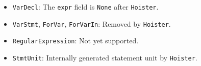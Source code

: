 \documentclass[a4paper, leqno]{amsart}
\newcommand{\stmt}{s}
\newcommand{\expr}{e}
\def\inred{\color{red}}
\def\inblue{\color{blue}}
\begin{document}
{\inred
\begin{itemize}
\item {\tt VarDecl}: The {\tt expr} field is {\tt None} after {\tt Hoister}.
\item {\tt VarStmt}, {\tt ForVar}, {\tt ForVarIn}: Removed by {\tt Hoister}.
\item {\tt RegularExpression}: Not yet supported.
\end{itemize}
}

{\inblue
\begin{itemize}
\item {\tt StmtUnit}: Internally generated statement unit by {\tt Hoister}.
\end{itemize}
}

\newpage
\newcommand{\ir}[1]{\ensuremath{\underline{#1}}}
\newcommand{\irid}{\ir{x}}
\newcommand{\irstmt}{\ir{\stmt}}
\newcommand{\irexpr}{\ir{\expr}}
\end{document}
